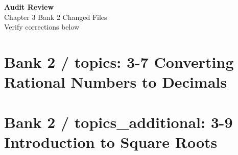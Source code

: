 \documentclass[12pt, fleqn, openany]{studyGuide}
\begin{document}
\begin{center}
\begin{tcolorbox}[
enhanced,
colback=white,
colframe=funTeal!60,
boxrule=1.5pt,
arc=10pt,
outer arc=10pt,
width=0.9\linewidth,
halign=center,
top=5mm, bottom=5mm,
]
{\Large\bfseries\sffamily\color{funTealDark}Audit Review}\\[2mm]
{\large\sffamily\color{funGrayDark}Chapter 3 Bank 2 Changed Files}\\[2mm]
{\normalsize\sffamily\color{funGrayDark}Verify corrections below}
\end{tcolorbox}
\end{center}

\newpage
\section*{Bank 2 / topics: 3-7 Converting Rational Numbers to Decimals}


\newpage
\section*{Bank 2 / topics\_additional: 3-9 Introduction to Square Roots}

\end{document}
